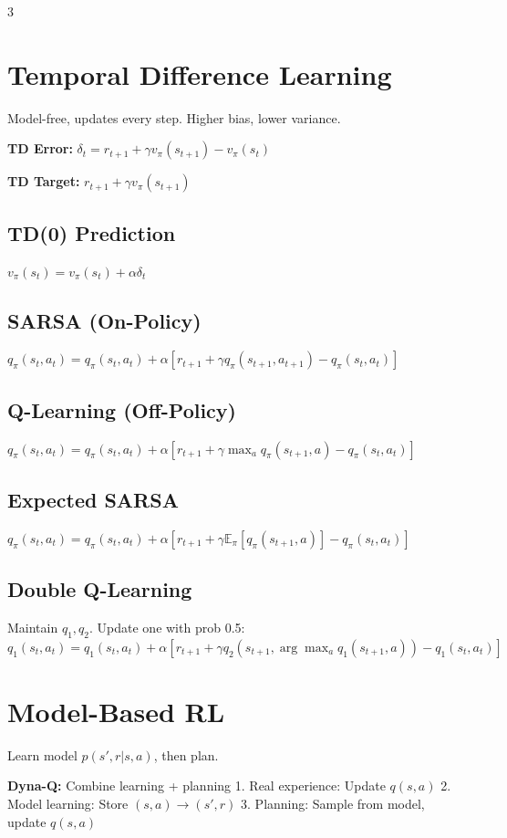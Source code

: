 \documentclass[8pt,landscape,a4paper]{article}
\begin{document}
\begin{multicols*}{3}
\section{Temporal Difference Learning}
Model-free, updates every step. Higher bias, lower variance.

\textbf{TD Error:} $\delta_t = r_{t+1} + \gamma v_\pi(s_{t+1}) - v_\pi(s_t)$

\textbf{TD Target:} $r_{t+1} + \gamma v_\pi(s_{t+1})$

\subsection{TD(0) Prediction}
$v_\pi(s_t) = v_\pi(s_t) + \alpha \delta_t$

\subsection{SARSA (On-Policy)}
$q_\pi(s_t,a_t) = q_\pi(s_t,a_t) + \alpha[r_{t+1} + \gamma q_\pi(s_{t+1},a_{t+1}) - q_\pi(s_t,a_t)]$

\subsection{Q-Learning (Off-Policy)}
$q_\pi(s_t,a_t) = q_\pi(s_t,a_t) + \alpha[r_{t+1} + \gamma \max_a q_\pi(s_{t+1},a) - q_\pi(s_t,a_t)]$

\subsection{Expected SARSA}
$q_\pi(s_t,a_t) = q_\pi(s_t,a_t) + \alpha[r_{t+1} + \gamma \mathbb{E}_\pi[q_\pi(s_{t+1},a)] - q_\pi(s_t,a_t)]$

\subsection{Double Q-Learning}
Maintain $q_1, q_2$. Update one with prob 0.5:
$q_1(s_t,a_t) = q_1(s_t,a_t) + \alpha[r_{t+1} + \gamma q_2(s_{t+1}, \arg\max_a q_1(s_{t+1},a)) - q_1(s_t,a_t)]$

\section{Model-Based RL}
Learn model $p(s',r|s,a)$, then plan.

\textbf{Dyna-Q:} Combine learning + planning
1. Real experience: Update $q(s,a)$
2. Model learning: Store $(s,a) \to (s',r)$
3. Planning: Sample from model, update $q(s,a)$


\end{multicols*}
\end{document}
